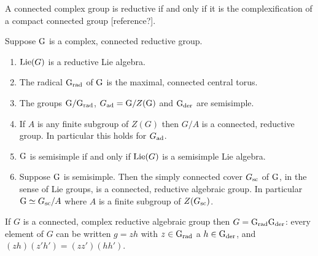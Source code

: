A connected complex group is reductive if and only if it is the complexification of a compact connected group [reference?].


Suppose $\text{G}$ is a complex, connected reductive group. 
\begin{enumerate}
\item $\text{Lie}(G)$ is a reductive Lie algebra.

\item The radical  $\text{G}_{\text{rad}}$ of $\text{G}$ is the maximal, connected central torus. 

\item The groups  $\text{G}/\text{G}_{\text{rad}}$, $G_{\text{ad}}=\text{G}/Z(\text{G})$  and $\text{G}_{\text{der}}$ are semisimple.

\item If $A$ is any finite subgroup of $Z(G)$ then $G/A$ is a connected, reductive group.
In particular this holds for $G_{\text{ad}}$.

\item $\text{G}$ is semisimple if and only if $\text{Lie}(G)$ is a semisimple Lie algebra.

\item Suppose $\text{G}$ is semisimple. Then the 
simply  connected cover $G_{\text{sc}}$ of $\text{G}$, in the sense of Lie groups, is a connected, reductive algebraic group.
In particular $\text{G}\simeq G_{\text{sc}}/A$ where $A$ is a finite subgroup of $Z(G_{\text{sc}})$. 

\end{enumerate}

\begin{lemma}
\item If $G$ is a connected, complex reductive algebraic group then
$G=\text{G}_{\text{rad}}\text{G}_{\text{der}}$: every element of $G$ can be written $g=zh$ with
$z\in \text{G}_{\text{rad}}$ a $h\in\text{G}_{\text{der}}$, and $(zh)(z'h')=(zz')(hh')$.
\end{lemma}


